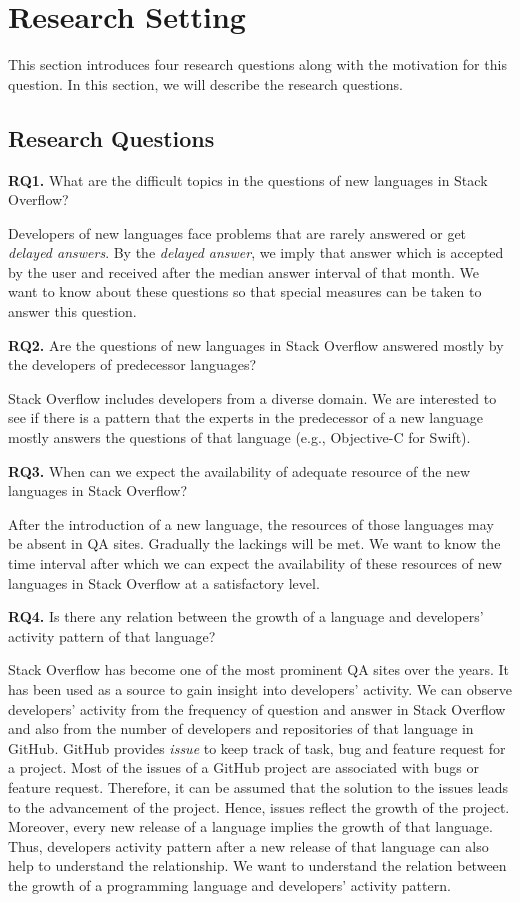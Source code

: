 \section{Research Setting}
\label{sec:Research Setting}
This section introduces four research questions along with the motivation for this question. In this section, we will describe the research questions.

\subsection{Research Questions}
\noindent \textbf{RQ1.} What are the difficult topics in the questions of new languages in Stack Overflow?

\indent  Developers of new languages face problems that are rarely answered or get \emph{delayed answers}. By the \emph{delayed answer}, we imply that answer which is accepted by the user and received after the median answer interval of that month. We want to know about these questions so that special measures can be taken to answer this question.


\noindent  \textbf{RQ2.} Are the questions of new languages in Stack Overflow answered mostly by the developers of predecessor languages?

\indent Stack Overflow includes developers from a diverse domain. We are interested to see if there is a pattern that the experts in the predecessor of a new language mostly answers the questions of that language (e.g., Objective-C for Swift).


\noindent  \textbf{RQ3.} When can we expect the availability of adequate resource of the new languages in Stack Overflow?

\indent After the introduction of a new language, the resources of those languages may be absent in QA sites. Gradually the lackings will be met. We want to know the time interval after which we can expect the availability of these resources of new languages in Stack Overflow at a satisfactory level.

\noindent  \textbf{RQ4.} Is there any relation between the growth of a language and developers' activity pattern of that language?

\indent Stack Overflow has become one of the most prominent QA sites over the years. It has been used as a source to gain insight into developers' activity\citep{Ahmed2017}. We can observe developers' activity from the frequency of question and answer in Stack Overflow and also from the number of developers and repositories of that language in GitHub. GitHub provides \emph{issue}\citep{GithubIssue} to keep track of task, bug and feature request for a project. Most of the issues of a GitHub project are associated with bugs or feature request\citep{Bissyande2013}. Therefore, it can be assumed that the solution to the issues leads to the advancement of the project. Hence, issues reflect the growth of the project. Moreover, every new release of a language implies the growth of that language. Thus, developers activity pattern after a new release of that language can also help to understand the relationship. We want to understand the relation between the growth of a programming language and developers' activity pattern.

